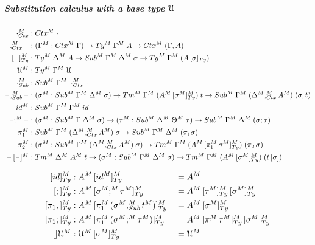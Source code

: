 \documentclass[a4paper,UKenglish,numberwithinsect,cleveref,thm-restate]{lipics-v2021}
\begin{document}
\subparagraph*{Substitution calculus with a base type $\mathcal{U}$}
\begin{alignat*}{10}
  \emptyctx_{\Ctx}^M        & : \Ctx^M\;\emptyctx \\
  \blank,_{\Ctx}^M\blank    & : (\Gamma^M : \Ctx^M\;\Gamma) \to \Ty^M\;\Gamma^M\;A \to \Ctx^M\;(\Gamma, A) \\
  \subTyM{\blank}{\blank} & : \Ty^M\;\Delta^M\;A \to \Sub^M\;\Gamma^M\;\Delta^M\;\sigma \to \Ty^M\;\Gamma^M\;(\subTy{A}{\sigma}) \\
  \UU^M                  & : \Ty^M\;\Gamma^M\;\UU \\
  \emptysub_{\Sub}^M     & : \Sub^M\;\Gamma^M\;\emptyctx_{\Ctx}^M\;\cdot \\
  \blank,_{\Sub}^M\blank & : (\sigma^M : \Sub^M\;\Gamma^M\;\Delta^M\;\sigma) \to \Tm^M\;\Gamma^M\;(\subTyM{A^M}{\sigma^M})\;t \to \Sub^M\;\Gamma^M\;(\Delta^M ,^M_{\Ctx} A^M)\;(\sigma, t) \\
  \idS^M                 & : \Sub^M\;\Gamma^M\;\Gamma^M\;\idS \\
  \blank;^M\blank        & : (\sigma^M : \Sub^M\;\Gamma\;\Delta^M\;\sigma) \to (\tau^M : \Sub^M\;\Delta^M\;\Theta^M\;\tau) \to \Sub^M\;\Gamma^M\;\Delta^M\;(\sigma ; \tau) \\
  \pi_1^M                & : \Sub^M\;\Gamma^M\;(\Delta^M ,_{\Ctx}^M A^M)\;\sigma \to \Sub^M\;\Gamma^M\;\Delta^M\;(\pi_1\sigma) \\
  \pi_2^M                & : (\sigma^M : \Sub^M\;\Gamma^M\;(\Delta^M ,_{\Ctx}^M A^M)\;\sigma) \to \Tm^M\;\Gamma^M\;(\subTyM{A^M}{\pi_1^M\,\sigma^M})\;(\pi_2\,\sigma) \\
  \subM{\blank}{\blank}  & : \Tm^M\;\Delta^M\;A^M\;t \to (\sigma^M : \Sub^M\;\Gamma^M\;\Delta^M\;\sigma) \to \Tm^M\;\Gamma^M\;(\subTyM{A^M}{\sigma^M})\;(\sub{t}{\sigma} )
\end{alignat*}

\begin{alignat*}{5}
  [\idS]_{\Ty}^M      & : \subTyM{A^M}{\idS^M}                             && = A^M \\
  [;]_{\Ty}^M         & : \subTyM{A^M}{\sigma^M ;^M \tau^M}                && = \subTyM{\subTyM{A^M}{\tau^M}}{\sigma^M} \\
  [\pi_1,]^M_{\Ty}    & : \subTyM{A^M}{\pi_1^M\,(\sigma^M ,^M_{\Sub} t^M)} && = \subTyM{A^M}{\sigma^M} \\
  [\pi_1;]^M_{\Ty}    & : \subTyM{A^M}{\pi_1^M\,(\sigma^M ;^M \tau^M)}     && = \subTyM{\subTyM{A^M}{\pi_1^M\,\tau^M}}{\sigma^M} \\
  []\UU^M             & : \subTyM{\UU^M}{\sigma^M}                         && = \UU^M
\end{alignat*}
\end{document}
